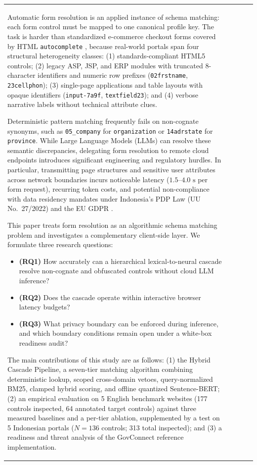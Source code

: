 \documentclass[runningheads,a4paper]{llncs}
\begin{document}
\begin{table}[t]
\begin{tabular}{p{3.2cm}cccc}
Automatic form resolution is an applied instance of schema matching: each form control must be mapped to one canonical profile key. The task is harder than standardized e-commerce checkout forms covered by HTML \texttt{autocomplete} \cite{whatwg2026}, because real-world portals span four structural heterogeneity classes: (1) standards-compliant HTML5 controls; (2) legacy ASP, JSP, and ERP modules with truncated 8-character identifiers and numeric row prefixes (\texttt{02frstname}, \texttt{23cellphon}); (3) single-page applications and table layouts with opaque identifiers (\texttt{input-7a9f}, \texttt{textfield23}); and (4) verbose narrative labels without technical attribute clues.

Deterministic pattern matching frequently fails on non-cognate synonyms, such as \texttt{05\_company} for \texttt{organization} or \texttt{14adrstate} for \texttt{province}. While Large Language Models (LLMs) can resolve these semantic discrepancies, delegating form resolution to remote cloud endpoints introduces significant engineering and regulatory hurdles. In particular, transmitting page structures and sensitive user attributes across network boundaries incurs noticeable latency ($1.5\text{--}4.0\text{ s}$ per form request), recurring token costs, and potential non-compliance with data residency mandates under Indonesia's PDP Law (UU No.~27/2022) \cite{pdp2022} and the EU GDPR \cite{gdpr2016}.

This paper treats form resolution as an algorithmic schema matching problem and investigates a complementary client-side layer. We formulate three research questions:
\begin{itemize}
    \item \textbf{(RQ1)} How accurately can a hierarchical lexical-to-neural cascade resolve non-cognate and obfuscated controls without cloud LLM inference?
    \item \textbf{(RQ2)} Does the cascade operate within interactive browser latency budgets?
    \item \textbf{(RQ3)} What privacy boundary can be enforced during inference, and which boundary conditions remain open under a white-box readiness audit?
\end{itemize}

The main contributions of this study are as follows: (1) the Hybrid Cascade Pipeline, a seven-tier matching algorithm combining deterministic lookup, scoped cross-domain vetoes, query-normalized BM25, clamped hybrid scoring, and offline quantized Sentence-BERT; (2) an empirical evaluation on 5 English benchmark websites (177 controls inspected, 64 annotated target controls) against three measured baselines and a per-tier ablation, supplemented by a test on 5 Indonesian portals ($N = 136$ controls; 313 total inspected); and (3) a readiness and threat analysis of the GovConnect reference implementation.


\end{tabular}
\end{table}
\end{document}
